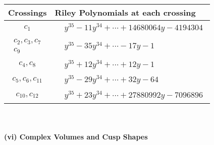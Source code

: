 \documentclass[1p]{elsarticle_modified}
\theoremstyle{definition}
\begin{document}
\begin{tabular}{m{50pt}|m{274pt}}
Crossings & \hspace{64pt}Riley Polynomials at each crossing \\
\hline $$\begin{aligned}c_{1}\end{aligned}$$&$\begin{aligned}
&y^{35}-11 y^{34}+\cdots+14680064 y-4194304
\end{aligned}$\\
\hline $$\begin{aligned}c_{2},c_{3},c_{7}\\c_{9}\end{aligned}$$&$\begin{aligned}
&y^{35}-35 y^{34}+\cdots-17 y-1
\end{aligned}$\\
\hline $$\begin{aligned}c_{4},c_{8}\end{aligned}$$&$\begin{aligned}
&y^{35}+12 y^{34}+\cdots+12 y-1
\end{aligned}$\\
\hline $$\begin{aligned}c_{5},c_{6},c_{11}\end{aligned}$$&$\begin{aligned}
&y^{35}-29 y^{34}+\cdots+32 y-64
\end{aligned}$\\
\hline $$\begin{aligned}c_{10},c_{12}\end{aligned}$$&$\begin{aligned}
&y^{35}+23 y^{34}+\cdots+27880992 y-7096896
\end{aligned}$\\
\hline
\end{tabular}\\~\\
\newpage\flushleft \textbf{(vi) Complex Volumes and Cusp Shapes}
\end{document}
